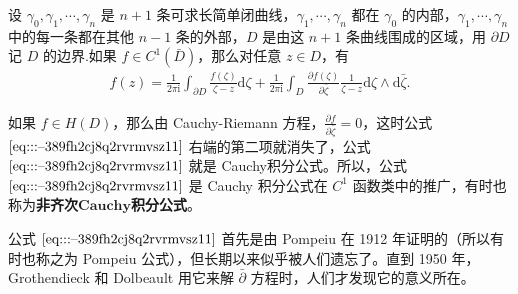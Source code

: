 \documentclass[../../main.tex]{subfiles}%
\begin{document}
\begin{theorem}\label{theorem:非齐次Cauchy积分公式(Pompeiu公式)}
设 \( \gamma_0, \gamma_1, \cdots, \gamma_n \) 是 \( n + 1 \) 条可求长简单闭曲线，\( \gamma_1, \cdots, \gamma_n \) 都在 \( \gamma_0 \) 的内部，\( \gamma_1, \cdots, \gamma_n \) 中的每一条都在其他 \( n - 1 \) 条的外部，\( D \) 是由这 \( n + 1 \) 条曲线围成的区域，用 \(\partial D \) 记 \( D \) 的边界.如果 \( f \in C^1(\bar{D}) \)，那么对任意 \( z \in D \)，有
\begin{align}
f(z) = \frac{1}{2\pi \mathrm{i}} \int_{\partial D} \frac{f(\zeta)}{\zeta - z} \mathrm{d}\zeta + \frac{1}{2\pi \mathrm{i}} \int_D \frac{\partial f(\zeta)}{\partial \bar{\zeta}} \frac{1}{\zeta - z} \mathrm{d}\zeta \wedge \mathrm{d}\bar{\zeta}. \label{eq:::--389fh2cj8q2rvrmvsz11}
\end{align}
\end{theorem}
\begin{note}
如果 \( f \in H(D) \)，那么由 Cauchy-Riemann 方程，\( \frac{\partial f}{\partial \bar{\zeta}} = 0 \)，这时公式 \(\eqref{eq:::--389fh2cj8q2rvrmvsz11}\) 右端的第二项就消失了，公式 \(\eqref{eq:::--389fh2cj8q2rvrmvsz11}\) 就是 Cauchy积分公式。所以，公式 \(\eqref{eq:::--389fh2cj8q2rvrmvsz11}\) 是 Cauchy 积分公式在 \( C^1 \) 函数类中的推广，有时也称为\textbf{非齐次}$\mathbf{Cauchy}$\textbf{积分公式}。

公式 \(\eqref{eq:::--389fh2cj8q2rvrmvsz11}\) 首先是由 Pompeiu 在 1912 年证明的（所以有时也称之为 Pompeiu 公式），但长期以来似乎被人们遗忘了。直到 1950 年，Grothendieck 和 Dolbeault 用它来解 \( \bar{\partial} \) 方程时，人们才发现它的意义所在。
\end{note}
\end{document}
